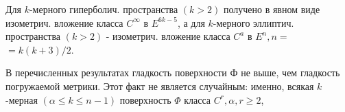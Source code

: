 \documentclass[10pt]{article}
\begin{document}
Для $k$-мерного гиперболич. пространства $(k>2)$ получено в явном виде изометрич. вложение класса $C^{\infty}$ в $E^{6 k-5}$, а для $k$-мерного эллиптич. пространства $(k>2)$ - изометрич. вложение класса $C^{a}$ в $E^{n}, n=$ $=k(k+3) / 2$.



В перечисленных результатах гладкость поверхности Ф не выше, чем гладкость погружаемой метрики. Этот факт не является случайным: именно, всякая $k$-мерная $(\alpha \leqslant k \leqslant n-1)$ поверхность $\Phi$ класса $C^{r}, \alpha, r \geqslant 2$,
\end{document}
